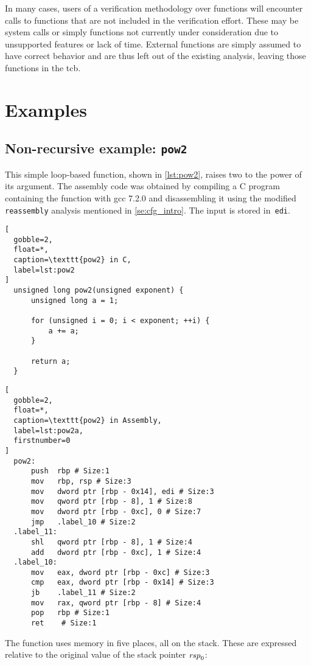 In many cases, users of a verification methodology over functions
will encounter calls to functions that are not included in the verification effort.
These may be system calls or simply functions not currently under consideration
due to unsupported features or lack of time.
External functions are simply assumed to have correct behavior
and are thus left out of the existing analysis,
leaving those functions in the \ac{tcb}.


\section{Examples}\label{se:cfg_examples}
\subsection{Non-recursive example: \texttt{pow2}}
This simple loop-based function, shown in \cref{lst:pow2},
raises two to the power of its argument.
The assembly code was obtained by compiling a C program containing the function
with \ac{gcc} 7.2.0
and disassembling it using the modified \lstinline|reassembly| analysis
mentioned in \cref{se:cfg_intro}. The input is stored in~\lstinline{edi}.
\begin{lstlisting}[
  gobble=2,
  float=*,
  caption=\texttt{pow2} in C,
  label=lst:pow2
]
  unsigned long pow2(unsigned exponent) {
      unsigned long a = 1;
      
      for (unsigned i = 0; i < exponent; ++i) {
          a += a;
      }
      
      return a;
  }
\end{lstlisting}
\begin{lstlisting}[
  gobble=2,
  float=*,
  caption=\texttt{pow2} in Assembly,
  label=lst:pow2a,
  firstnumber=0
]
  pow2:
      push	rbp # Size:1
      mov	rbp, rsp # Size:3
      mov	dword ptr [rbp - 0x14], edi # Size:3
      mov	qword ptr [rbp - 8], 1 # Size:8
      mov	dword ptr [rbp - 0xc], 0 # Size:7
      jmp	.label_10 # Size:2
  .label_11:
      shl	qword ptr [rbp - 8], 1 # Size:4
      add	dword ptr [rbp - 0xc], 1 # Size:4
  .label_10:
      mov	eax, dword ptr [rbp - 0xc] # Size:3
      cmp	eax, dword ptr [rbp - 0x14] # Size:3
      jb	.label_11 # Size:2
      mov	rax, qword ptr [rbp - 8] # Size:4
      pop	rbp # Size:1
      ret	 # Size:1
\end{lstlisting}
The function uses memory in five places, all on the stack.
These are expressed relative to the original value of the stack pointer $\mathit{rsp}_0$:
